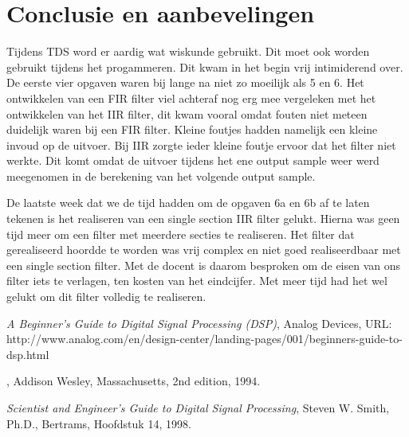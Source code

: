 \documentclass[11pt,a4paper]{article}
\begin{document}
 
	\section{Conclusie en aanbevelingen}
	Tijdens TDS word er aardig wat wiskunde gebruikt. Dit moet ook worden gebruikt tijdens het progammeren. Dit kwam in het begin vrij intimiderend over. De eerste vier opgaven waren bij lange na niet zo moeilijk als 5 en 6. 
	Het ontwikkelen van een FIR filter viel achteraf nog erg mee vergeleken met het ontwikkelen van het IIR filter, dit kwam vooral omdat fouten niet meteen duidelijk waren bij een FIR filter. Kleine foutjes hadden namelijk een kleine invoud op de uitvoer. 
	Bij IIR zorgte ieder kleine foutje ervoor dat het filter niet werkte. Dit komt omdat de uitvoer tijdens het ene output sample weer werd meegenomen in de berekening van het volgende output sample.

	De laatste week dat we de tijd hadden om de opgaven 6a en 6b af te laten tekenen is het realiseren van een single section IIR filter gelukt. Hierna was geen tijd meer om een filter met meerdere secties te realiseren.
	Het filter dat gerealiseerd hoordde te worden was vrij complex en niet goed realiseerdbaar met een single section filter. Met de docent is daarom besproken om de eisen van ons filter iets te verlagen, ten kosten van het eindcijfer. Met meer tijd had het wel gelukt om dit filter volledig te realiseren. 
	
	
		
	\begin{thebibliography}{9}

  		
  		\textit{A Beginner's Guide to Digital Signal Processing (DSP)},
  		Analog Devices,
  		URL: http://www.analog.com/en/design-center/landing-pages/001/beginners-guide-to-dsp.html 

	
	\bibitem{}
  		
  		\textit{},
  		Addison Wesley, Massachusetts,
  		2nd edition,
  		1994.
  		
  		
  		\textit{Scientist and Engineer's Guide to Digital Signal Processing},
  		Steven W. Smith, Ph.D., 
  		Bertrams,
  		Hoofdstuk 14,
  		1998.  		
		
	\end{thebibliography}
\end{document}
